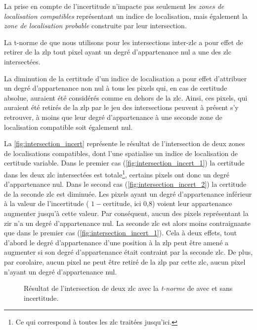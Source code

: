 La prise en compte de l'incertitude n'impacte pas seulement les
\emph{zones de localisation compatibles} représentant un indice de
localisation, mais également la \emph{zone de localisation probable}
construite par leur intersection.

La t-norme de  que nous utilisons pour les intersections
inter-\ac{zlc} a pour effet de retirer de la \ac{zlp} tout pixel ayant
un degré d'appartenance nul a une des \ac{zlc} intersectées.

La diminution de la certitude d'un indice de localisation a pour effet
d'attribuer un degré d'appartenance non nul à tous les pixels qui, en
cas de certitude absolue, auraient été considérés comme en dehors de
la \ac{zlc}. Ainsi, ces pixels, qui auraient été retirés de la
\ac{zlp} par le jeu des intersections peuvent à présent s'y retrouver,
à moins que leur degré d'appartenance à une seconde zone de
localisation compatible soit également nul.

La \autoref{fig:intersection_incert} représente le résultat de
l'intersection de deux zones de localisations compatibles, dont l'une
spatialise un indice de localisation de certitude variable. Dans le
premier cas (\ref{fig:intersection_incert_1}) la certitude dans les
deux \ac{zlc} intersectées est totale\footnote{Ce qui correspond à
  toutes les \ac{zlc} traitées jusqu'ici.}, certains pixels ont donc
un degré d'appartenance nul.
%
Dans le second cas (\ref{fig:intersection_incert_2}) la certitude de
la seconde \ac{zlc} est diminuée. Les pixels ayant un degré
d'appartenance inférieur à la valeur de l'incertitude (\ie
\(1-\text{certitude}\), ici 0,8) voient leur appartenance augmenter
jusqu'à cette valeur. Par conséquent, aucun des pixels représentant la
\ac{zir} n'a un degré d'appartenance nul. La seconde \ac{zlc} est
alors moins contraignante que dans le premier cas
(\ref{fig:intersection_incert_1}). Cela à deux effets, tout d'abord le
degré d'appartenance d'une position à la \ac{zlp} peut être amené a
augmenter si son degré d'appartenance était contraint par la seconde
\ac{zlc}. De plus, par corolaire, aucun pixel ne peut être retiré de
la \ac{zlp} par cette \ac{zlc}, aucun pixel n'ayant un degré
d'appartenance nul.


\begin{figure}
  \centering
  \subfloat[\label{fig:intersection_incert_1}]{}

  \subfloat[\label{fig:intersection_incert_2}]{}
  \caption{Résultat de l'intersection de deux \protect\ac{zlc} avec la
    \emph{t-norme} de  avec
    \protect{} et sans
    \protect{} incertitude.}
  \label{fig:intersection_incert}
\end{figure}



